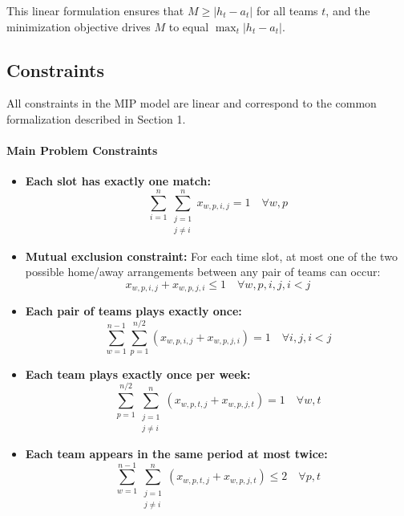 \documentclass[11pt]{article}
\begin{document}
This linear formulation ensures that $M \geq |h_t - a_t|$ for all teams $t$, and the minimization objective drives $M$ to equal $\max_{t} |h_t - a_t|$.

\subsection{Constraints}

All constraints in the MIP model are linear and correspond to the common formalization described in Section 1.

\paragraph{Main Problem Constraints}

\begin{itemize}
    \item \textbf{Each slot has exactly one match:}
    \begin{equation}
        \sum_{i=1}^{n} \sum_{\substack{j=1 \\ j \neq i}}^{n} x_{w,p,i,j} = 1 \quad \forall w, p
    \end{equation}

    \item \textbf{Mutual exclusion constraint:}
    For each time slot, at most one of the two possible home/away arrangements between any pair of teams can occur:
    \begin{equation}
        x_{w,p,i,j} + x_{w,p,j,i} \leq 1 \quad \forall w, p, i, j, i < j
    \end{equation}

    \item \textbf{Each pair of teams plays exactly once:}
    \begin{equation}
        \sum_{w=1}^{n-1} \sum_{p=1}^{n/2} (x_{w,p,i,j} + x_{w,p,j,i})  = 1 \quad \forall i,j, i < j
    \end{equation}

    \item \textbf{Each team plays exactly once per week:}
    \begin{equation}
        \sum_{p=1}^{n/2} \sum_{\substack{j=1 \\ j \neq i}}^{n} (x_{w,p,t,j} + x_{w,p,j,t}) = 1 \quad \forall w, t
    \end{equation}

    \item \textbf{Each team appears in the same period at most twice:}
    \begin{equation}
        \sum_{w=1}^{n-1} \sum_{\substack{j=1 \\ j \neq i}}^{n} (x_{w,p,t,j} + x_{w,p,j,t}) \leq 2 \quad \forall p, t
    \end{equation}
\end{itemize}
\end{document}
